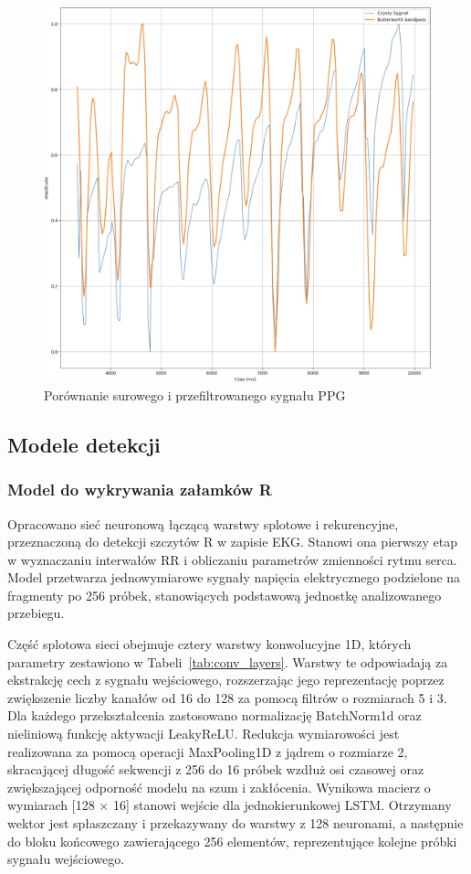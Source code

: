 \documentclass[journal]{IEEEtran}
\begin{document}
\begin{figure}[htbp]
    \centering
    \includegraphics[width=0.76\linewidth]{Filtr_PPG.png} 
    \caption{Porównanie surowego i przefiltrowanego sygnału PPG}
    \label{fig:filtr_ppg}
\end{figure}


\subsection{Modele detekcji}
\subsubsection{Model do wykrywania załamków R}
Opracowano sieć neuronową łączącą warstwy splotowe i rekurencyjne, przeznaczoną do detekcji szczytów R w zapisie EKG. Stanowi ona pierwszy etap w wyznaczaniu interwałów RR i obliczaniu parametrów zmienności rytmu serca. Model przetwarza jednowymiarowe sygnały napięcia elektrycznego podzielone na fragmenty po 256 próbek, stanowiących podstawową jednostkę analizowanego przebiegu.

Część splotowa sieci obejmuje cztery warstwy konwolucyjne 1D, których parametry zestawiono w Tabeli~\ref{tab:conv_layers}. Warstwy te odpowiadają za ekstrakcję cech z sygnału wejściowego, rozszerzając jego reprezentację poprzez zwiększenie liczby kanałów od 16 do 128 za pomocą filtrów o rozmiarach 5 i 3. Dla każdego przekształcenia zastosowano normalizację BatchNorm1d oraz nieliniową funkcję aktywacji LeakyReLU. Redukcja wymiarowości jest realizowana za pomocą operacji MaxPooling1D z jądrem o rozmiarze 2, skracającej długość sekwencji z 256 do 16 próbek wzdłuż osi czasowej oraz zwiększającej odporność modelu na szum i zakłócenia. Wynikowa macierz o wymiarach [128 × 16] stanowi wejście dla jednokierunkowej LSTM. Otrzymany wektor jest spłaszczany i przekazywany do warstwy z 128 neuronami, a następnie do bloku końcowego zawierającego 256 elementów, reprezentujące kolejne próbki sygnału wejściowego.
\end{document}
